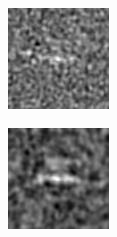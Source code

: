 \documentclass{article}
\begin{document}
\begin{figure}[h!]
\begin{subfigure}[b]{0.1\textwidth}
    \end{subfigure}
    \hspace{-1\baselineskip}
    \vspace{-0.5\baselineskip}
    \quad
    \begin{subfigure}[b]{0.1\textwidth}  
        \centering 
        \includegraphics[width=\textwidth]{plots/B_lin_SE2_template.jpg}

    \end{subfigure}
    \hspace{-1\baselineskip}
    \quad
    \begin{subfigure}[b]{0.1\textwidth}   
        \centering 
        \includegraphics[width=\textwidth]{plots/C_lin_SE2_template.jpg}


\end{subfigure}
\end{figure}
\end{document}
